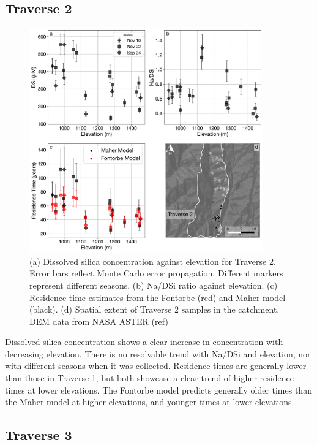 \subsection{Traverse 2}

\begin{figure}[h]
    \centering
        \includegraphics[width=0.9\textwidth]{Traverse_2_summary.pdf}
    \caption{(a) Dissolved silica concentration against elevation for Traverse 2. Error bars reflect Monte Carlo error propagation. Different markers represent different seasons. (b) Na/DSi ratio against elevation. (c) Residence time estimates from the Fontorbe (red) and Maher model (black). (d) Spatial extent of Traverse 2 samples in the catchment. DEM data from NASA ASTER (ref)}
    \label{fig:trav2}
\end{figure}

\FloatBarrier

Dissolved silica concentration shows a clear increase in concentration with decreasing elevation. There is no resolvable trend with Na/DSi and elevation, nor with different seasons when it was collected. Residence times are generally lower than those in Traverse 1, but both showcase a clear trend of higher residence times at lower elevations. The Fontorbe model predicts generally older times than the Maher model at higher elevations, and younger times at lower elevations. 




\subsection{Traverse 3}


